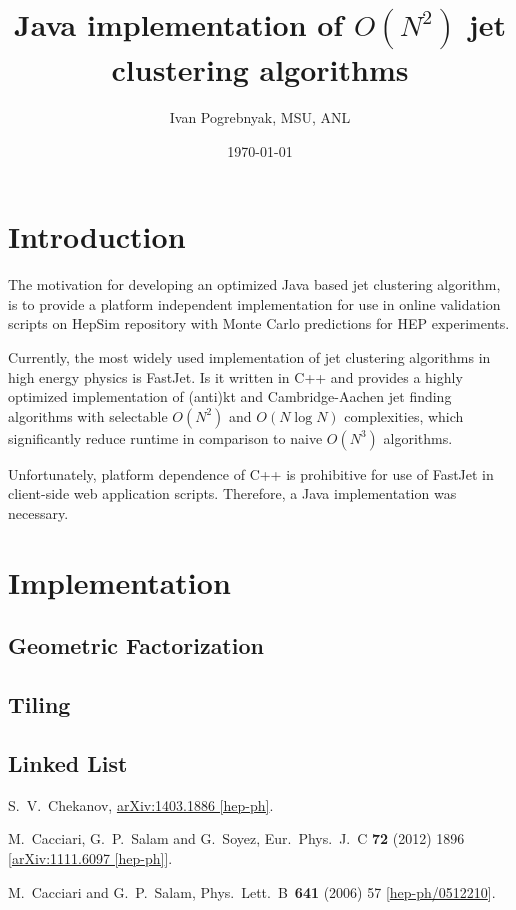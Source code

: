 \documentclass[12pt]{article}
\title{Java implementation of $O(N^2)$ jet clustering algorithms}
\author{Ivan Pogrebnyak, MSU, ANL}
\date{\today}
\begin{document}


\section{Introduction}
The motivation for developing an optimized Java based jet clustering algorithm, is to provide a platform independent implementation for use in online validation scripts on HepSim\cite{HepSim} repository with Monte Carlo predictions for HEP experiments.

Currently, the most widely used implementation of jet clustering algorithms in high energy physics is FastJet\cite{fastjet_man}. Is it written in C++ and provides a highly optimized implementation of (anti)kt and Cambridge-Aachen jet finding algorithms with selectable $O(N^2)$ and $O(N\log N)$ complexities, which significantly reduce runtime in comparison to naive $O(N^3)$ algorithms\cite{fastjet_n3}.

Unfortunately, platform dependence of C++ is prohibitive for use of FastJet in client-side web application  scripts. Therefore, a Java implementation was necessary.

\section{Implementation}


\subsection{Geometric Factorization}


\subsection{Tiling}


\subsection{Linked List}


\begin{thebibliography}{9}
  
  S.~V.~Chekanov,
  \href{http://arxiv.org/abs/1403.1886}{arXiv:1403.1886 [hep-ph]}.

  M.~Cacciari, G.~P.~Salam and G.~Soyez,
  Eur.\ Phys.\ J.\ C {\bf 72} (2012) 1896
  [\href{http://arxiv.org/abs/1111.6097}{arXiv:1111.6097 [hep-ph]}].

  M.~Cacciari and G.~P.~Salam,
  Phys.\ Lett.\ B\ {\bf 641} (2006) 57
  [\href{http://arxiv.org/abs/hep-ph/0512210}{hep-ph/0512210}].

\end{thebibliography}
\end{document}
